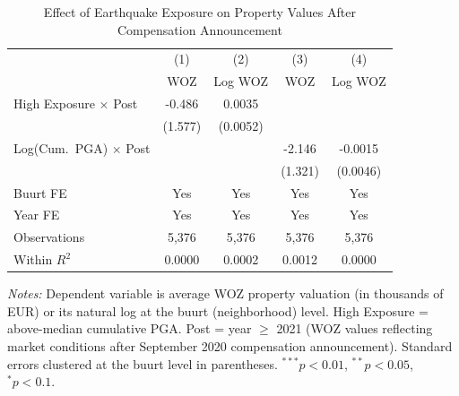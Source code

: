 \begin{table}[htbp]
\centering
\caption{Effect of Earthquake Exposure on Property Values After Compensation Announcement}
\label{tab:main}
\begin{tabular}{lcccc}
\hline\hline
 & (1) & (2) & (3) & (4) \\
 & WOZ & Log WOZ & WOZ & Log WOZ \\
\hline
High Exposure $\times$ Post & -0.486 & 0.0035 & & \\
 & (1.577) & (0.0052) & & \\[6pt]
Log(Cum.\ PGA) $\times$ Post & & & -2.146 & -0.0015 \\
 & & & (1.321) & (0.0046) \\[6pt]
\hline
Buurt FE & Yes & Yes & Yes & Yes \\
Year FE & Yes & Yes & Yes & Yes \\
Observations & 5,376 & 5,376 & 5,376 & 5,376 \\
Within $R^2$ & 0.0000 & 0.0002 & 0.0012 & 0.0000 \\
\hline\hline
\end{tabular}
\begin{tablenotes}[flushleft]
\small
\item \textit{Notes:} Dependent variable is average WOZ property valuation (in thousands of EUR) or its natural log at the buurt (neighborhood) level. High Exposure = above-median cumulative PGA. Post = year $\geq$ 2021 (WOZ values reflecting market conditions after September 2020 compensation announcement). Standard errors clustered at the buurt level in parentheses. $^{***}p<0.01$, $^{**}p<0.05$, $^{*}p<0.1$.
\end{tablenotes}
\end{table}
